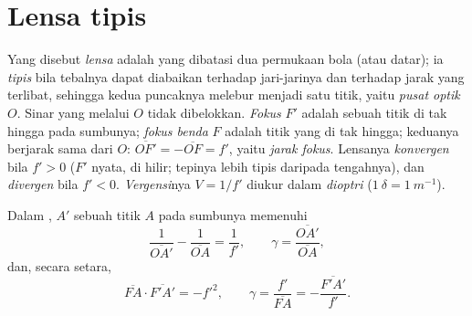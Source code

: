 \section{Lensa tipis}

\begin{definition}\label{def:b1:mirrors-thin-lenses:lens}
Yang disebut \emph{lensa} adalah  yang dibatasi dua permukaan bola
(atau datar); ia \emph{tipis} bila tebalnya dapat diabaikan terhadap
jari-jarinya dan terhadap jarak yang terlibat, sehingga kedua puncaknya
melebur menjadi satu titik, yaitu \emph{pusat optik} $O$. Sinar yang
melalui $O$ tidak dibelokkan. \emph{Fokus } $F'$ adalah
 sebuah titik di tak hingga pada sumbunya; \emph{fokus benda}
$F$ adalah titik yang  di tak hingga; keduanya berjarak sama
dari $O$: $\overline{OF'} = -\overline{OF} = f'$, yaitu \emph{jarak
fokus}. Lensanya \emph{konvergen} bila $f' > 0$ ($F'$ nyata, di hilir;
tepinya lebih tipis daripada tengahnya), dan \emph{divergen} bila
$f' < 0$. \emph{Vergensi}nya $V = 1/f'$ diukur dalam \emph{dioptri}
($\qty{1}{\delta} = \qty{1}{m^{-1}}$).
\end{definition}

\begin{theorem}\label{thm:b1:mirrors-thin-lenses:lensconj}
Dalam ,  $A'$ sebuah titik $A$ pada sumbunya
memenuhi 
\[
\frac{1}{\overline{OA'}} - \frac{1}{\overline{OA}} = \frac{1}{f'},
\qquad
\gamma = \frac{\overline{OA'}}{\overline{OA}},
\]
dan, secara setara, 
\[
\overline{FA}\cdot\overline{F'A'} = -f'^2,
\qquad
\gamma = \frac{f'}{\overline{FA}} = -\frac{\overline{F'A'}}{f'} .
\]
\end{theorem}

